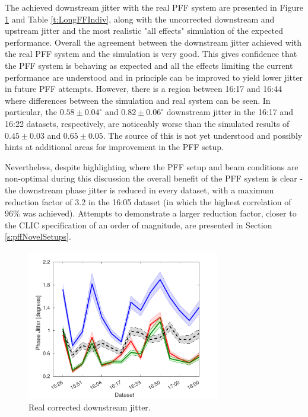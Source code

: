 The achieved downstream jitter with the real PFF system are presented in Figure \ref{f:longFF_jitDatSet} and Table \ref{t:LongFFIndiv}, along with the uncorrected downstream and upstream jitter and the most realistic "all effects" simulation of the expected performance. Overall the agreement between the downstream jitter achieved with the real PFF system and the simulation is very good. This gives confidence that the PFF system is behaving as expected and all the effects limiting the current performance are understood and in principle can be improved to yield lower jitter in future PFF attempts. However, there is a region between 16:17 and 16:44 where differences between the simulation and real system can be seen. In particular, the \(0.58\pm0.04^\circ\) and \(0.82\pm0.06^\circ\) downstream jitter in the 16:17 and 16:22 datasets, respectively, are noticeably worse than the simulated results of \(0.45\pm0.03\) and \(0.65\pm0.05\). The source of this is not yet understood and possibly hints at additional areas for improvement in the PFF setup. 

Nevertheless, despite highlighting where the PFF setup and beam conditions are non-optimal during this discussion the overall benefit of the PFF system is clear - the downstream phase jitter is reduced in every dataset, with a maximum reduction factor of 3.2 in the 16:05 dataset (in which the highest correlation of 96\% was achieved). Attempts to demonstrate a larger reduction factor, closer to the CLIC specification of an order of magnitude, are presented in Section \ref{s:pffNovelSetups}. 

\begin{figure}
  \centering
  \includegraphics[width=0.75\textwidth]{Figures/feedforward/longFF_jitDatSet}
  \caption{Real corrected downstream jitter.}
  \label{f:longFF_jitDatSet}
\end{figure}

